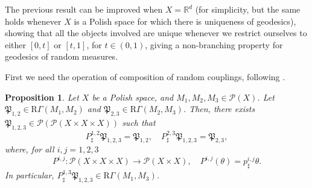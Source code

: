 \documentclass[10pt,leqno]{amsart}
\numberwithin{equation}{section}
\newtheorem{prop}[teorema]{Proposition}
\newcommand{\R}{\mathbb{R}}
\newcommand{\PP}{\mathcal{P}}
\begin{document}
The previous result can be improved when $X = \R^d$ (for simplicity, but the same holds whenever $X$ is a Polish space for which there is uniqueness of geodesics), showing that all the objects involved are unique whenever we restrict ourselves to either $[0,t]$ or $[t,1]$, for $t\in(0,1)$, giving a non-branching property for geodesics of random measures.

First we need the operation of composition of random couplings, following \cite[Lemma 5.3.2]{ambrosio2005gradient}.

\begin{prop}\label{prop: comp rand couplings}
    Let $X$ be a Polish space, and $M_1,M_2,M_3 \in \PP(X)$. Let $\mathfrak{P}_{1,2} \in \mathrm{R}\Gamma(M_1,M_2)$ and $\mathfrak{P}_{2,3} \in \mathrm{R}\Gamma(M_2,M_3)$. Then, there exists $\mathfrak{P}_{1,2,3}\in \PP(\PP(X\times X \times X))$ such that 
    \begin{equation}
        P^{1,2}_\sharp  \mathfrak{P}_{1,2,3} = \mathfrak{P}_{1,2}, \quad P^{2,3}_\sharp  \mathfrak{P}_{1,2,3} = \mathfrak{P}_{2,3},
    \end{equation}
    where, for all $i,j = 1,2,3$ 
    \[P^{i,j}:\mathcal{P}(X\times X \times X) \to \PP(X\times X), \quad P^{i,j}(\theta) = p^{i,j}_\sharp \theta.\]
    In particular, $P^{1,3}_\sharp \mathfrak{P}_{1,2,3}\in \mathrm{R}\Gamma(M_1,M_3)$.
\end{prop}
\end{document}
